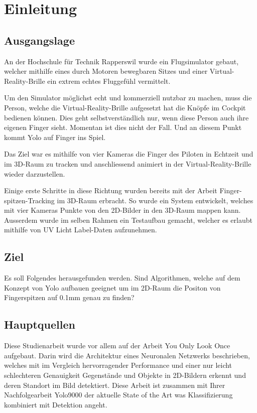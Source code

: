 \newpage
\section{Einleitung}
\subsection{Ausgangslage}
An der Hochschule für Technik Rapperswil wurde ein Flugsimulator gebaut, welcher  mithilfe eines durch Motoren bewegbaren Sitzes und einer Virtual-Reality-Brille ein extrem echtes Fluggefühl vermittelt.

Um den Simulator möglichst echt und kommerziell nutzbar zu machen, muss die Person, welche die Virtual-Reality-Brille aufgesetzt hat die Knöpfe im Cockpit bedienen können. 
Dies geht selbstverständlich nur, wenn diese Person auch ihre eigenen Finger sieht.
Momentan ist dies nicht der Fall.
Und an diesem Punkt kommt \grqq{}Yolo auf Finger\grqq{} ins Spiel.

Das Ziel war es mithilfe von vier Kameras die Finger des Piloten in Echtzeit und im 3D-Raum zu tracken und anschliessend animiert in der Virtual-Reality-Brille wieder darzustellen.

Einige erste Schritte in diese Richtung wurden bereits mit der Arbeit \grqq{}Finger-spitzen-Tracking im 3D-Raum\grqq{} \cite{TabeasFingertracking} erbracht.
So wurde ein System entwickelt, welches mit vier Kameras Punkte von den 2D-Bilder in den 3D-Raum mappen kann.
Ausserdem wurde im selben Rahmen ein Testaufbau gemacht, welcher es erlaubt mithilfe von UV Licht Label-Daten aufzunehmen.

\subsection{Ziel}
Es soll Folgendes herausgefunden werden. 
Sind Algorithmen, welche auf dem Konzept von Yolo\cite{yolo} aufbauen geeignet um im 2D-Raum die Positon von Fingerspitzen auf 0.1mm genau zu finden?

\subsection{Hauptquellen}
Diese Studienarbeit wurde vor allem auf der Arbeit \grqq{}You Only Look Once\grqq{}\cite{yolo} aufgebaut.
Darin wird die Architektur eines Neuronalen Netzwerks beschrieben, welches mit im Vergleich hervorragender Performance und einer nur leicht schlechteren Genauigkeit Gegenstände und Objekte in 2D-Bildern erkennt und deren Standort im Bild detektiert.
Diese Arbeit ist zusammen mit Ihrer Nachfolgearbeit \grqq{}Yolo9000\grqq{} \cite{yolo2} der aktuelle State of the Art was Klassifizierung kombiniert mit Detektion angeht. \cite{yolo} \cite{yolo2}

